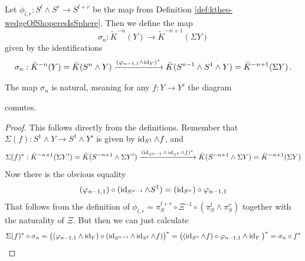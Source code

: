 \begin{definition}
	Let	$\phi_{l,r}:S^l\wedge S^r\to S^{l+r}$ be the map from Definition \ref{def:ktheo-wedgeOfShoperesIsSphere}.
	Then we define the map 
		\begin{equation*}
			\sigma_n:\tilde{K}^{-n}(Y)\to \tilde{K}^{-n+1}(\Sigma Y)
		\end{equation*}
	given by the identifications
	\begin{equation*}
		\sigma_n: \tilde{K}^{-n}(Y)=\tilde{K}(S^n\wedge Y) \xrightarrow{(\varphi_{n-1,1}\wedge\operatorname{\mathrm{id}}_Y)^*}\tilde{K}(S^{n-1}\wedge S^1\wedge Y)=\tilde{K}^{-n+1}(\Sigma Y)\,.
	\end{equation*}
\end{definition}
\begin{corollary}
    The map $\sigma_n$ is natural, meaning for any $f:Y\to Y'$ the diagram 
	\begin{center}
	\end{center} comutes.
\end{corollary}
\begin{proof}
	This follows directly from the definitions. Remember that $\Sigma(f):S^1\wedge Y\to S^1\wedge Y'$ is given by $\operatorname{\mathrm{id}}_{S^1}\wedge f$, and \begin{equation*}
		\Sigma(f)^*:\tilde{K}^{-n+1}(\Sigma Y')=\tilde{K}(S^{-n+1}\wedge \Sigma Y')\xrightarrow{(\operatorname{\mathrm{id}}_{S^{n-1}}\wedge \operatorname{\mathrm{id}}_{S^1} \wedge f)^*} \tilde{K}(S^{-n+1}\wedge \Sigma Y)=\tilde{K}^{-n+1}(\Sigma Y)
	\end{equation*}
	Now there is the obvious equality 
	\begin{equation*}
		(\varphi_{n-1,1})\circ (\operatorname{\mathrm{id}}_{S^{n-1}}\wedge S^1)=(\operatorname{\mathrm{id}}_{S^n})\circ \varphi_{n-1,1}
	\end{equation*} That follows from the definition of $\phi_{l,r}=\pi_S^{l+r}\circ \Xi^{-1}\circ (\pi_S^l\wedge \pi_S^r)$ together with the naturality of $\Xi$.
But then we can just calculate
	\begin{align*}
		\Sigma(f)^*\circ \sigma_n=\big((\varphi_{n-1,1}\wedge \operatorname{\mathrm{id}}_Y)\circ (\operatorname{\mathrm{id}}_{S^{n-1}}\wedge \operatorname{\mathrm{id}}_{S^1}\wedge f)\big)^*=\big((\operatorname{\mathrm{id}}_{S^n}\wedge f)\circ \varphi_{n-1,1}\wedge \operatorname{\mathrm{id}}_Y\big)^*=\sigma_n\circ f^*
	\end{align*}
\end{proof}





